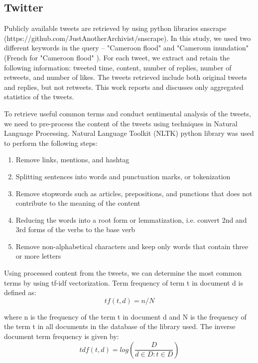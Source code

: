 \subsection{Twitter}

Publicly available tweets are retrieved by using python libraries snscrape (https://github.com/JustAnotherArchivist/snscrape). In this study, we used two different keywords in the query – "Cameroon flood" and "Cameroun inundation" (French for "Cameroon flood" ). For each tweet, we extract and retain the following information: tweeted time, content, number of replies, number of retweets, and number of likes. The tweets retrieved include both original tweets and replies, but not retweets. This work reports and discusses only aggregated statistics of the tweets.

To retrieve useful common terms and conduct sentimental analysis of the tweets, we need to pre-process the content of the tweets using techniques in Natural Language Processing. Natural Language Toolkit (NLTK) python library was used to perform the following steps:
\begin{enumerate}
    \item Remove links, mentions, and hashtag
    \item Splitting sentences into words and punctuation marks, or tokenization
    \item Remove stopwords such as articles, prepositions, and punctions that does not contribute to the meaning of the content
    \item Reducing the words into a root form or lemmatization, i.e. convert 2nd and 3rd forms of the verbs to the base verb
    \item Remove non-alphabetical characters and keep only words that contain three or more letters
\end{enumerate}

Using processed content from the tweets, we can determine the most common terms by using tf-idf vectorization. Term frequency of term t in document d is defined as:
\begin{equation}
tf(t,d)=n/N
\end{equation}

where n is the frequency of the term t in document d and N is the frequency of the term t in all documents in the database of the library used. The inverse document term frequency is given by:
\begin{equation}
tdf(t,d)=log(\frac{D}{d\in D: t \in D})
\end{equation}

